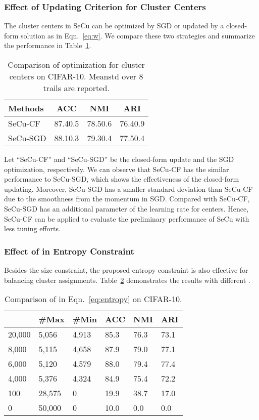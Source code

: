 \documentclass[10pt,twocolumn,letterpaper]{article}
\begin{document}
\subsubsection{Effect of Updating Criterion for Cluster Centers}
The cluster centers in SeCu can be optimized by SGD or updated by a closed-form solution as in Eqn.~\ref{eq:w}. We compare these two strategies and summarize the performance in Table~\ref{ta:cf10opt}.

\begin{table}[!ht]
\centering
\begin{tabular}{|l|c|c|c|}\hline
Methods&ACC&NMI&ARI\\\hline
SeCu-CF &87.40.5&78.50.6&76.40.9\\
SeCu-SGD &88.10.3&79.30.4&77.50.4\\\hline
\end{tabular}
\caption{Comparison of optimization for cluster centers on CIFAR-10. Meanstd over 8 trails are reported.}\label{ta:cf10opt}
\end{table}

Let ``SeCu-CF'' and ``SeCu-SGD'' be the closed-form update and the SGD optimization, respectively. We can observe that SeCu-CF has the similar performance to SeCu-SGD, which shows the effectiveness of the closed-form updating. Moreover, SeCu-SGD has a smaller standard deviation than SeCu-CF due to the smoothness from the momentum in SGD. Compared with SeCu-CF, SeCu-SGD has an additional parameter of the learning rate for centers. Hence, SeCu-CF can be applied to evaluate the preliminary performance of SeCu with less tuning efforts. 


\subsubsection{Effect of  in Entropy Constraint}\label{sec:alpha}

Besides the size constraint, the proposed entropy constraint is also effective for balancing cluster assignments. Table~\ref{ta:alpha} demonstrates the results with different . 

\begin{table}[!ht]
\centering
\begin{tabular}{|l|l|l|l|l|l|}\hline
&\#Max&\#Min&ACC&NMI&ARI\\\hline
20,000&5,056&4,913&85.3&76.3&73.1\\
8,000&5,115&4,658&87.9&79.0&77.1\\
6,000&5,120&4,579&88.0&79.4&77.4\\
4,000&5,376&4,324&84.9&75.4&72.2\\
100&28,575&0&19.9&38.7&17.0\\
0&50,000&0&10.0&0.0&0.0\\\hline
\end{tabular}
\caption{Comparison of  in Eqn.~\ref{eq:entropy} on CIFAR-10. }\label{ta:alpha}
\end{table}
\end{document}
